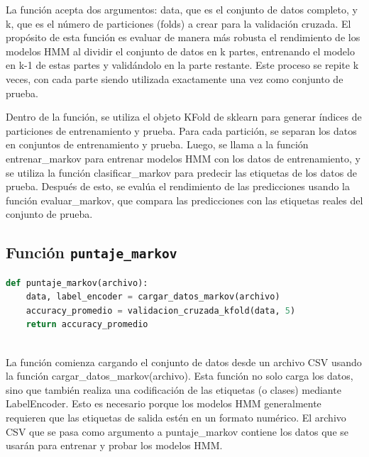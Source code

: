\documentclass[12pt]{article}
\begin{document}
La función  acepta dos argumentos: data, que es el conjunto de datos completo, y k, que es el número de particiones (folds) a crear para la validación cruzada. El propósito de esta función es evaluar de manera más robusta el rendimiento de los modelos HMM al dividir el conjunto de datos en k partes, entrenando el modelo en k-1 de estas partes y validándolo en la parte restante. Este proceso se repite k veces, con cada parte siendo utilizada exactamente una vez como conjunto de prueba.\vspace{1cm}

Dentro de la función, se utiliza el objeto KFold de sklearn para generar índices de particiones de entrenamiento y prueba. Para cada partición, se separan los datos en conjuntos de entrenamiento y prueba. Luego, se llama a la función entrenar\_markov para entrenar modelos HMM con los datos de entrenamiento, y se utiliza la función clasificar\_markov para predecir las etiquetas de los datos de prueba. Después de esto, se evalúa el rendimiento de las predicciones usando la función evaluar\_markov, que compara las predicciones con las etiquetas reales del conjunto de prueba.

\vspace{1cm}

\subsection*{Función \texttt{puntaje\_markov}}
\vspace{1cm}

\begin{lstlisting}[language=Python]
def puntaje_markov(archivo):
	data, label_encoder = cargar_datos_markov(archivo)
	accuracy_promedio = validacion_cruzada_kfold(data, 5)
	return accuracy_promedio
	
\end{lstlisting}
\vspace{1cm}

La función comienza cargando el conjunto de datos desde un archivo CSV usando la función cargar\_datos\_markov(archivo). Esta función no solo carga los datos, sino que también realiza una codificación de las etiquetas (o clases) mediante LabelEncoder. Esto es necesario porque los modelos HMM generalmente requieren que las etiquetas de salida estén en un formato numérico. El archivo CSV que se pasa como argumento a puntaje\_markov contiene los datos que se usarán para entrenar y probar los modelos HMM.\vspace{1cm}
\end{document}
